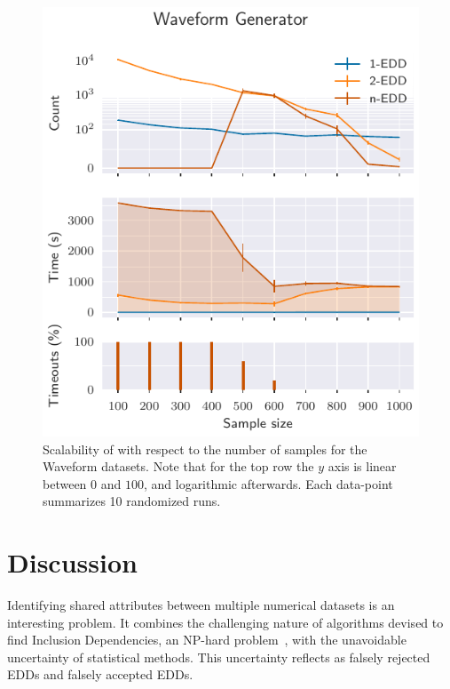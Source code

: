 \begin{figure}[htb]
    \centering
    \includegraphics{images/presq/scalability_sample_wave}
    \caption{
        Scalability of \PresQ with respect to the number of samples for the Waveform datasets.
        Note that for the top row the $y$ axis is linear between $0$ and $100$, and
        logarithmic afterwards. Each data-point summarizes 10 randomized runs.
    }
    \label{fig:scalability_sample_size}
\end{figure}

\FloatBarrier

\section{Discussion}
\label{sec:discussion}

Identifying shared attributes between multiple numerical datasets is an interesting
problem. It combines the challenging nature of algorithms devised to find Inclusion Dependencies,
an NP-hard problem~\cite{kantola1992}, with the unavoidable uncertainty of statistical
methods.
This uncertainty reflects as falsely rejected EDDs and falsely accepted EDDs.

